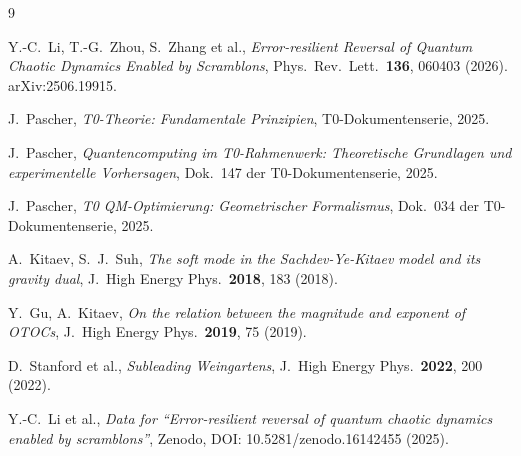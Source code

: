 \begin{thebibliography}{9}

Y.-C.~Li, T.-G.~Zhou, S.~Zhang et al.,
\textit{Error-resilient Reversal of Quantum Chaotic Dynamics Enabled by Scramblons},
Phys.\ Rev.\ Lett.\ \textbf{136}, 060403 (2026).
arXiv:2506.19915.

J.~Pascher,
\textit{T0-Theorie: Fundamentale Prinzipien},
T0-Dokumentenserie, 2025.

J.~Pascher,
\textit{Quantencomputing im T0-Rahmenwerk: Theoretische Grundlagen und experimentelle Vorhersagen},
Dok.~147 der T0-Dokumentenserie, 2025.

J.~Pascher,
\textit{T0 QM-Optimierung: Geometrischer Formalismus},
Dok.~034 der T0-Dokumentenserie, 2025.

A.~Kitaev, S.~J.~Suh,
\textit{The soft mode in the Sachdev-Ye-Kitaev model and its gravity dual},
J.\ High Energy Phys.\ \textbf{2018}, 183 (2018).

Y.~Gu, A.~Kitaev,
\textit{On the relation between the magnitude and exponent of OTOCs},
J.\ High Energy Phys.\ \textbf{2019}, 75 (2019).

D.~Stanford et al.,
\textit{Subleading Weingartens},
J.\ High Energy Phys.\ \textbf{2022}, 200 (2022).

Y.-C.~Li et al.,
\textit{Data for ``Error-resilient reversal of quantum chaotic dynamics enabled by scramblons''},
Zenodo, DOI: 10.5281/zenodo.16142455 (2025).

\end{thebibliography}
